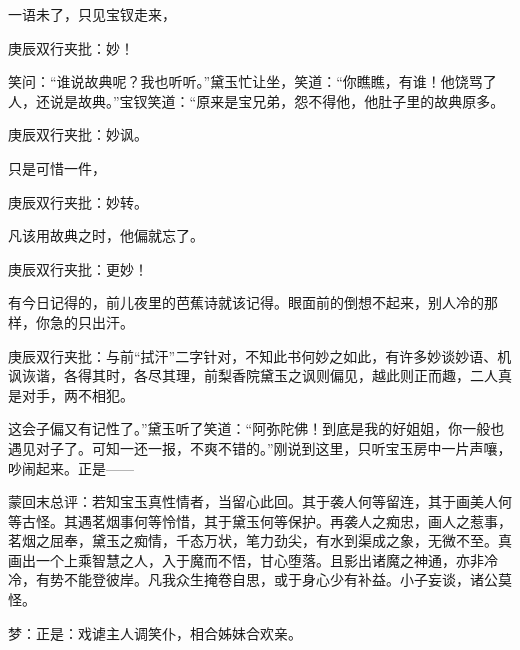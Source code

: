 \begin{parag}
    一语未了，只见宝钗走来，\begin{note}庚辰双行夹批：妙！\end{note}笑问：“谁说故典呢？我也听听。”黛玉忙让坐，笑道：“你瞧瞧，有谁！他饶骂了人，还说是故典。”宝钗笑道：“原来是宝兄弟，怨不得他，他肚子里的故典原多。\begin{note}庚辰双行夹批：妙讽。\end{note}只是可惜一件，\begin{note}庚辰双行夹批：妙转。\end{note}凡该用故典之时，他偏就忘了。\begin{note}庚辰双行夹批：更妙！\end{note}有今日记得的，前儿夜里的芭蕉诗就该记得。眼面前的倒想不起来，别人冷的那样，你急的只出汗。\begin{note}庚辰双行夹批：与前“拭汗”二字针对，不知此书何妙之如此，有许多妙谈妙语、机讽诙谐，各得其时，各尽其理，前梨香院黛玉之讽则偏见，越此则正而趣，二人真是对手，两不相犯。\end{note}这会子偏又有记性了。”黛玉听了笑道：“阿弥陀佛！到底是我的好姐姐，你一般也遇见对子了。可知一还一报，不爽不错的。”刚说到这里，只听宝玉房中一片声嚷，吵闹起来。正是——
\end{parag}


\begin{parag}
    \begin{note}蒙回末总评：若知宝玉真性情者，当留心此回。其于袭人何等留连，其于画美人何等古怪。其遇茗烟事何等怜惜，其于黛玉何等保护。再袭人之痴忠，画人之惹事，茗烟之屈奉，黛玉之痴情，千态万状，笔力劲尖，有水到渠成之象，无微不至。真画出一个上乘智慧之人，入于魔而不悟，甘心堕落。且影出诸魔之神通，亦非冷冷，有势不能登彼岸。凡我众生掩卷自思，或于身心少有补益。小子妄谈，诸公莫怪。\end{note}
\end{parag}


\begin{parag}
    \begin{note}梦：正是：戏谑主人调笑仆，相合姊妹合欢亲。\end{note}
\end{parag}

